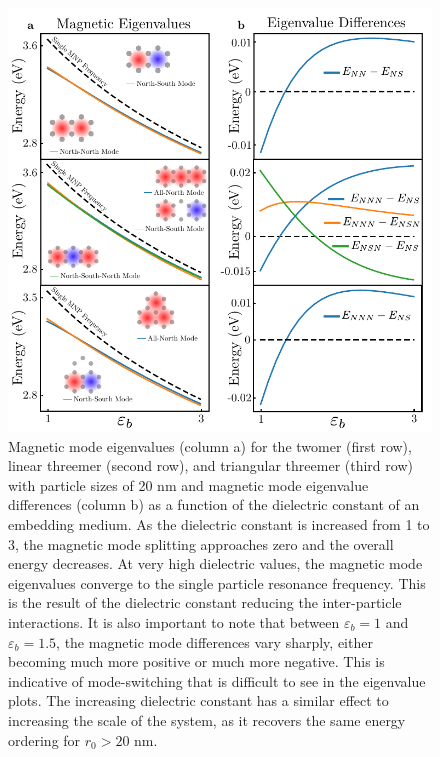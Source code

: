 \documentclass[journal=apchd5,manuscript=article]{achemso}
\begin{document}
\begin{figure}
\centering
\includegraphics{dielectric_study.pdf}
\caption{Magnetic mode eigenvalues (column a) for the twomer (first row), linear threemer (second row), and triangular threemer (third row) with particle sizes of 20 nm and magnetic mode eigenvalue differences (column b) as a function of the dielectric constant of an embedding medium. As the dielectric constant is increased from 1 to 3, the magnetic mode splitting approaches zero and the overall energy decreases. At very high dielectric values, the magnetic mode eigenvalues converge to the single particle resonance frequency. This is the result of the dielectric constant reducing the inter-particle interactions. It is also important to note that between $\varepsilon_b = 1$ and $\varepsilon_b = 1.5$, the magnetic mode differences vary sharply, either becoming much more positive or much more negative. This is indicative of mode-switching that is difficult to see in the eigenvalue plots. The increasing dielectric constant has a similar effect to increasing the scale of the system, as it recovers the same energy ordering for $r_0 > 20$ nm.}
\label{dielectric}
\end{figure}
\end{document}
